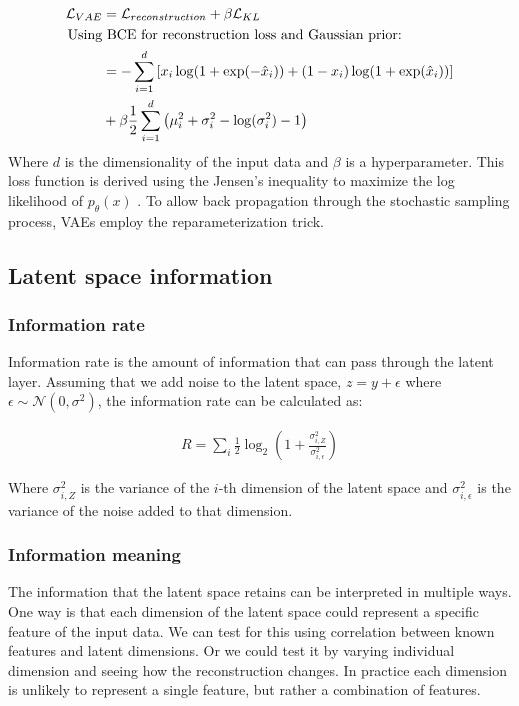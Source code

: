 \documentclass[conference,a4paper]{IEEEtran}
\begin{document}
\begin{align}
\mathcal{L}_{VAE} &= \mathcal{L}_{reconstruction} + \beta \mathcal{L}_{KL}\\
\text{Using}&\text{ BCE for reconstruction loss and Gaussian prior:} \notag\\
&= -\sum_{i=1}^{d} \left[ x_i \log(1+\exp(-\hat{x}_i)) + (1 - x_i)  \log(1+\exp(\hat{x}_i)) \right]\notag \\ &+ \beta \frac{1}{2} \sum_{i=1}^{d} \left( \mu_i^2 + \sigma_i^2 - \log(\sigma_i^2) - 1 \right)
\end{align}
\noindent Where $d$ is the dimensionality of the input data and $\beta$ is a hyperparameter. This loss function is derived using the Jensen's inequality to maximize the log likelihood of $p_\theta(x)$ \cite{kingmaAutoEncodingVariationalBayes2022}. To allow back propagation through the stochastic sampling process, VAEs employ the reparameterization trick.

\subsection{Latent space information}

\subsubsection{Information rate}
Information rate is the amount of information that can pass through the latent layer. Assuming that we add noise to the latent space, $z = y + \epsilon$ where $\epsilon \sim \mathcal{N}(0, \sigma^2)$, the information rate can be calculated as:

\begin{align}
R = \sum_i \frac{1}{2} \log_2 \left(1 + \frac{\sigma_{i,Z}^2}{\sigma_{i, \epsilon}^2}\right)
\label{eq:info_rate}
\end{align}

\noindent Where $\sigma_{i,Z}^2$ is the variance of the $i$-th dimension of the latent space and $\sigma_{i, \epsilon}^2$ is the variance of the noise added to that dimension.

\subsubsection{Information meaning}

The information that the latent space retains can be interpreted in multiple ways. One way is that each dimension of the latent space could represent a specific feature of the input data. We can test for this using correlation between known features and latent dimensions. Or we could test it by varying individual dimension and seeing how the reconstruction changes. In practice each dimension is unlikely to represent a single feature, but rather a combination of features.
\end{document}
